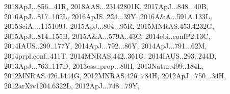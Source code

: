 \documentclass[12pt]{article}
\begin{document}
\begin{enumerate}
\begin{enumerate}
{2018ApJ...856...41R,%
2018AAS...23142801K,%
2017ApJ...848...40B,%
2016ApJ...817..102L,%
2016ApJS..224...39Y,%
2016A&A...591A.133L,%
2015SciA....115109J,%
2015ApJ...804...95R,%
2015MNRAS.453.4232G,%
2015ApJ...814..155B,%
2015A&A...579A..43C,%
2014ebi..confP2.13C,%
2014IAUS..299..177Y,%
2014ApJ...792...86Y,%
2014ApJ...791...62M,%
2014prpl.conf..411T,%
2014MNRAS.442..361G,%
2014IAUS..293..244D,%
2013ApJ...763..117D,%
2013oss..prop...80H,%
2013Natur.499..184L,%
2012MNRAS.426.1444G,%
2012MNRAS.426..784H,%
2012ApJ...750...34H,%
2012arXiv1204.6322L,%
2012ApJ...748...79Y,%
}
\end{enumerate}
\end{enumerate}
\end{document}
